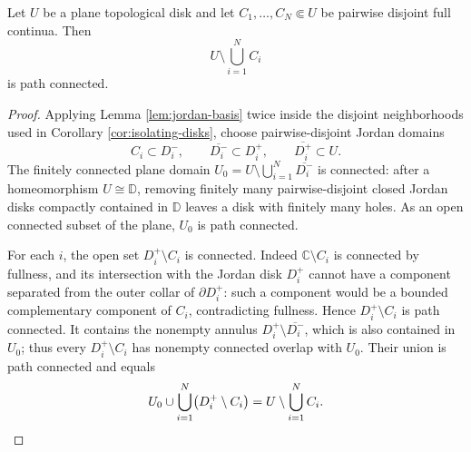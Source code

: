 \begin{lemma}\label{lem:connectivity}
Let \(U\) be a plane topological disk and let \(C_1,\dots,C_N\Subset U\) be pairwise disjoint full continua.  Then
\[
 U\setminus\bigcup_{i=1}^N C_i
\]
is path connected.
\end{lemma}

\begin{proof}
Applying Lemma \ref{lem:jordan-basis} twice inside the disjoint neighborhoods used in Corollary \ref{cor:isolating-disks}, choose pairwise-disjoint Jordan domains
\[
 C_i\subset D_i^-,\qquad \overline{D_i^-}\subset D_i^+,\qquad \overline{D_i^+}\subset U.
\]
The finitely connected plane domain \(U_0=U\setminus\bigcup_{i=1}^N\overline{D_i^-}\) is connected: after a homeomorphism \(U\cong\mathbb D\), removing finitely many pairwise-disjoint closed Jordan disks compactly contained in \(\mathbb D\) leaves a disk with finitely many holes.  As an open connected subset of the plane, \(U_0\) is path connected.

For each \(i\), the open set \(D_i^+\setminus C_i\) is connected.  Indeed \(\mathbb C\setminus C_i\) is connected by fullness, and its intersection with the Jordan disk \(D_i^+\) cannot have a component separated from the outer collar of \(\partial D_i^+\): such a component would be a bounded complementary component of \(C_i\), contradicting fullness.  Hence \(D_i^+\setminus C_i\) is path connected.  It contains the nonempty annulus \(D_i^+\setminus\overline{D_i^-}\), which is also contained in \(U_0\); thus every \(D_i^+\setminus C_i\) has nonempty connected overlap with \(U_0\).  Their union is path connected and equals
\[
 U_0\cup\bigcup_{i=1}^N\bigl(D_i^+\setminus C_i\bigr)=U\setminus\bigcup_{i=1}^N C_i. \qedhere
\]
\end{proof}